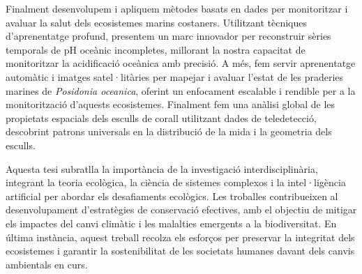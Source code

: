 Finalment desenvolupem i apliquem mètodes basats en dades per monitoritzar i
avaluar la salut dels ecosistemes marins costaners. Utilitzant tècniques
d'aprenentatge profund, presentem un marc innovador per reconstruir sèries
temporals de pH oceànic incompletes, millorant la nostra capacitat de
monitoritzar la acidificació oceànica amb precisió. A més, fem servir
aprenentatge automàtic i imatges satel·litàries per mapejar i avaluar l'estat
de les praderies marines de \textit{Posidonia oceanica}, oferint un enfocament
escalable i rendible per a la monitorització d'aquests ecosistemes. Finalment
fem una anàlisi global de les propietats espacials dels esculls de corall
utilitzant dades de teledetecció, descobrint patrons universals en la
distribució de la mida i la geometria dels esculls.

Aquesta tesi subratlla la importància de la investigació interdisciplinària,
integrant la teoria ecològica, la ciència de sistemes complexos i la
intel·ligència artificial per abordar els desafiaments ecològics. Les troballes
contribueixen al desenvolupament d'estratègies de conservació efectives, amb el
objectiu de mitigar els impactes del canvi climàtic i les malalties
emergents a la biodiversitat. En última instància, aquest treball recolza els
esforços per preservar la integritat dels ecosistemes i garantir la
sostenibilitat de les societats humanes davant dels canvis ambientals en
curs.

\vfill